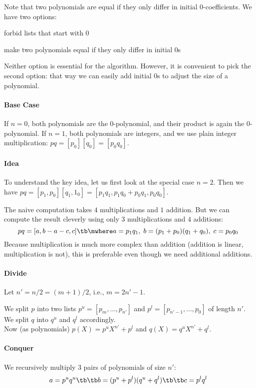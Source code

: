 Note that two polynomials are equal if they only differ in initial $0$-coefficients.
We have two options:
\begin{compactitem}
\item forbid lists that start with $0$
\item make two polynomials equal if they only differ in initial $0$s
\end{compactitem}
Neither option is essential for the algorithm.
However, it is convenient to pick the second option: that way we can easily add initial $0$s to adjust the size of a polynomial.

\paragraph{Base Case}
If $n=0$, both polynomials are the $0$-polynomial, and their product is again the $0$-polynomial.
If $n=1$, both polynomials are integers, and we use plain integer multiplication: $pq=[p_0][q_0]=[p_0 q_0]$.

\paragraph{Idea}
To understand the key idea, let us first look at the special case $n=2$.
Then we have $pq=[p_1,p_0][q_1,1_0]=[p_1 q_1, p_1 q_0 + p_0 q_1, p_0 q_0]$.

The naive computation takes $4$ multiplications and $1$ addition.
But we can compute the result cleverly using only $3$ multiplications and $4$ additions:
\[pq=[a, b-a-c, c] \tb\mwhere a=p_1q_1, \;b=(p_1+p_0)(q_1+q_0),\;c=p_0 q_0\]
Because multiplication is much more complex than addition (addition is linear, multiplication is not), this is preferable even though we need additional additions.

\paragraph{Divide}
Let $n'=n/2=(m+1)/2$, i.e., $m=2n'-1$.

We split $p$ into two lists $p^u=[p_m,\ldots,p_{n'}]$ and $p^l=[p_{n'-1},\ldots,p_0]$ of length $n'$.
We split $q$ into $q^u$ and $q^l$ accordingly.\\

Now (as polynomials) $p(X)=p^u X^{n'}+p^l$ and $q(X)=q^u X^{n'}+q^l$.

\paragraph{Conquer}
We recursively multiply $3$ pairs of polynomials of size $n'$:
  \[a=p^u q^u \tb\tb b=(p^u+p^l)(q^u+q^l) \tb\tb c=p^l q^l\]

